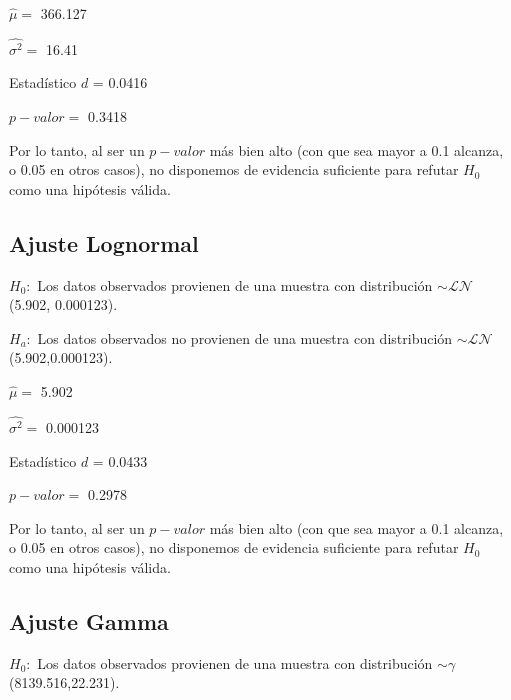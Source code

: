 \documentclass[a4paper,10pt]{article}
\begin{document}
\noindent$\hat{\mu} =$ 366.127
\vspace{0.2in}

\noindent$\hat{\sigma^2} =$ 16.41
\vspace{0.2in}

\noindent Estadístico $d$ = 0.0416
\vspace{0.2in}

\noindent$p-valor =$ 0.3418
\vspace{0.2in}

Por lo tanto, al ser un $p-valor$ más bien alto (con que sea mayor a 0.1 alcanza, o 0.05 en otros casos), no disponemos de evidencia suficiente para
refutar $H_0$ como una hipótesis válida.


\subsection*{Ajuste Lognormal}

\vspace{0.2in}

$H_0:$ Los datos observados provienen de una muestra con distribución $\sim \mathcal{LN}$(5.902, 0.000123).
\vspace{0.2in}

\noindent$H_a:$ Los datos observados no provienen de una muestra con distribución $\sim \mathcal{LN}$(5.902,0.000123).
\vspace{0.2in}

\noindent$\hat{\mu} =$ 5.902
\vspace{0.2in}

\noindent$\hat{\sigma^2} =$ 0.000123
\vspace{0.2in}

\noindent Estadístico $d$ = 0.0433
\vspace{0.2in}

\noindent$p-valor =$ 0.2978
\vspace{0.2in}

Por lo tanto, al ser un $p-valor$ más bien alto (con que sea mayor a 0.1 alcanza, o 0.05 en otros casos), no disponemos de evidencia suficiente para
refutar $H_0$ como una hipótesis válida.


\subsection*{Ajuste Gamma}

\vspace{0.2in}

$H_0:$ Los datos observados provienen de una muestra con distribución $\sim \gamma$(8139.516,22.231).
\vspace{0.09in}
\end{document}
